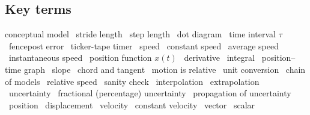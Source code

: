 \documentclass[11pt,twoside,openany]{book}
\newcounter{check}[chapter]
\begin{document}
\subsection*{Key terms}
conceptual model \textperiodcentered\ stride length \textperiodcentered\ step length \textperiodcentered\ dot diagram \textperiodcentered\ time interval $\tau$ \textperiodcentered\ fencepost error \textperiodcentered\ ticker-tape timer \textperiodcentered\ speed \textperiodcentered\ constant speed \textperiodcentered\ average speed \textperiodcentered\ instantaneous speed \textperiodcentered\ position function $x(t)$ \textperiodcentered\ derivative \textperiodcentered\ integral \textperiodcentered\ position--time graph \textperiodcentered\ slope \textperiodcentered\ chord and tangent \textperiodcentered\ motion is relative \textperiodcentered\ unit conversion \textperiodcentered\ chain of models \textperiodcentered\ relative speed \textperiodcentered\ sanity check \textperiodcentered\ interpolation \textperiodcentered\ extrapolation \textperiodcentered\ uncertainty \textperiodcentered\ fractional (percentage) uncertainty \textperiodcentered\ propagation of uncertainty \textperiodcentered\ position \textperiodcentered\ displacement \textperiodcentered\ velocity \textperiodcentered\ constant velocity \textperiodcentered\ vector \textperiodcentered\ scalar
\end{document}
